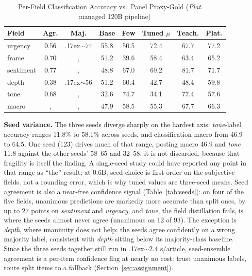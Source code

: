 \documentclass[10pt,journal]{IEEEtran}
\begin{document}
\begin{table}[t]
\centering
\caption{Per-Field Classification Accuracy vs.\ Panel Proxy-Gold (\emph{Plat.}\ = managed 120B pipeline)}
\label{tab:classification}
\small
\footnotesize\setlength{\tabcolsep}{3pt}\begin{tabular}{@{}lccccccc@{}}
\toprule
Field & Agr. & Maj. & Base & Few & Tuned $\mu$ & Teach. & Plat. \\
\midrule
urgency & 0.56 & {\raise.17ex\hbox{$\scriptstyle\sim$}}74 & 55.8 & 50.5 & 72.4 & 67.7 & 77.2 \\
frame & 0.70 &, & 51.2 & 39.6 & 58.4 & 63.4 & 65.2 \\
sentiment & 0.77 &, & 48.8 & 67.0 & 69.2 & 81.7 & 71.7 \\
depth & 0.38 & {\raise.17ex\hbox{$\scriptstyle\sim$}}56 & 51.2 & 60.4 & 42.7 & 48.4 & 59.8 \\
tone & 0.68 &, & 32.6 & 74.7 & 34.1 & 77.4 & 57.6 \\
macro &, &, & 47.9 & 58.5 & 55.3 & 67.7 & 66.3 \\
\bottomrule
\end{tabular}
\end{table}

\textbf{Seed variance.}\label{sec:seeds}
The three seeds diverge sharply on the hardest axis: \emph{tone}-label accuracy ranges 11.8\% to 58.1\% across seeds, and classification macro from 46.9 to 64.5. One seed (123) drives much of that range, posting macro 46.9 and \emph{tone} 11.8 against the other seeds' 58--65 and 32--58; it is not discarded, because that fragility is itself the finding. A single-seed study could have reported any point in that range as ``the'' result; at 0.6B, seed choice is first-order on the subjective fields, not a rounding error, which is why tuned values are three-seed means. Seed agreement is also a near-free confidence signal (Table~\ref{tab:seeds}): on four of the five fields, unanimous predictions are markedly more accurate than split ones, by up to 27 points on \emph{sentiment} and \emph{urgency}, and \emph{tone}, the field distillation fails, is where the seeds almost never agree (unanimous on 12 of 93). The exception is \emph{depth}, where unanimity does not help: the seeds agree confidently on a wrong majority label, consistent with \emph{depth} sitting below its majority-class baseline. Since the three seeds together still run in {\raise.17ex\hbox{$\scriptstyle\sim$}}2.4 s/article, seed-ensemble agreement is a per-item confidence flag at nearly no cost: trust unanimous labels, route split items to a fallback (Section~\ref{sec:assignment}).
\end{document}
